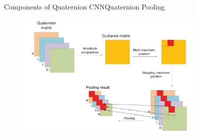 \documentclass{beamer}
\begin{document}
\begin{frame}{Components of Quaternion CNN}{Quaternion Pooling}
    \begin{figure}[H]
        \centering
        \includegraphics[width=0.8\textwidth]{img/3.jpg}
    \end{figure}
\end{frame}
\end{document}
